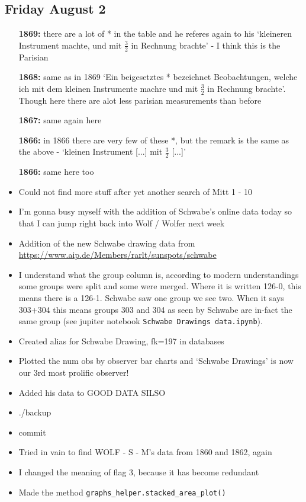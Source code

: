 \documentclass[12pt]{article}
\begin{document}
\subsection{Friday August 2}
\begin{itemize}
    \item[\textbf{1869:}] there are a lot of * in the table and he referes again to his `kleineren Instrument machte, und mit $\frac{3}{2}$ in Rechnung brachte' - I think this is the Parisian
    \item[\textbf{1868:}] same as in 1869 `Ein beigesetztes * bezeichnet Beobachtungen, welche ich mit dem kleinen Instrumente machre und mit $\frac{3}{2}$ in Rechnung brachte'. Though here there are alot less parisian measurements than before
    \item[\textbf{1867:}] same again here
    \item[\textbf{1866:}] in 1866 there are very few of these *, but the remark is the same as the above - `kleinen Instrument [...] mit $\frac{3}{2}$ [...]'
    \item[\textbf{1866:}] same here too
    \item Could not find more stuff after yet another search of Mitt 1 - 10
    
    \item I'm gonna busy myself with the addition of Schwabe's online data today so that I can jump right back into Wolf / Wolfer next week
    \item Addition of the new Schwabe drawing data from \href{https://www.aip.de/Members/rarlt/sunspots/schwabe}{https://www.aip.de/Members/rarlt/sunspots/schwabe}
    
    \item I understand what the group column is, according to modern understandings some groups were split and some were merged. Where it is written 126-0, this means there is a 126-1. Schwabe saw one group we see two. When it says 303+304 this means groups 303 and 304 as seen by Schwabe are in-fact the same group (see jupiter notebook \texttt{Schwabe Drawings data.ipynb}).
    \item Created alias for Schwabe Drawing, fk=197 in databases
    \item Plotted the num obs by observer bar charts and `Schwabe Drawings' is now our 3rd most prolific observer!
    \item Added his data to GOOD DATA SILSO
    \item ./backup
    \item commit
    \item Tried in vain to find WOLF - S - M's data from 1860 and 1862, again 
    \item I changed the meaning of flag 3, because it has become redundant
    \item Made the method \texttt{graphs\_helper.stacked\_area\_plot()}
\end{itemize}
\end{document}
